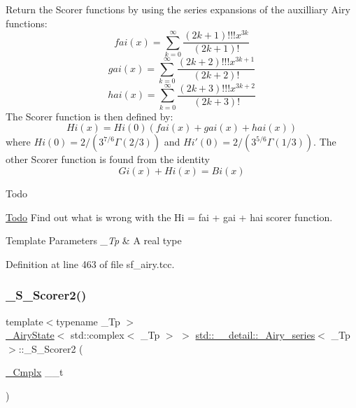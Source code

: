 Return the Scorer functions by using the series expansions of the auxilliary Airy functions\+: \[ fai(x) = \sum_{k=0}^\infty \frac{(2k+1)!!!x^{3k}}{(2k+1)!} \] \[ gai(x) = \sum_{k=0}^\infty \frac{(2k+2)!!!x^{3k+1}}{(2k+2)!} \] \[ hai(x) = \sum_{k=0}^\infty \frac{(2k+3)!!!x^{3k+2}}{(2k+3)!} \] The Scorer function is then defined by\+: \[ Hi(x) = Hi(0)\left(fai(x) + gai(x) + hai(x)\right) \] where $ Hi(0) = 2/(3^{7/6}\Gamma(2/3)) $ and $ Hi'(0) = 2/(3^{5/6}\Gamma(1/3)) $. The other Scorer function is found from the identity \[ Gi(x) + Hi(x) = Bi(x) \]

\begin{DoxyRefDesc}{Todo}
\item[\hyperlink{todo__todo000002}{Todo}]Find out what is wrong with the Hi = fai + gai + hai scorer function.\end{DoxyRefDesc}



\begin{DoxyTemplParams}{Template Parameters}
{\em \+\_\+\+Tp} & A real type \\
\hline
\end{DoxyTemplParams}


Definition at line 463 of file sf\+\_\+airy.\+tcc.

\mbox{\label{classstd_1_1____detail_1_1__Airy__series_a0fb092c153034223a390e259d2f32836}} 
\subsubsection{\texorpdfstring{\+\_\+\+S\+\_\+\+Scorer2()}{\_S\_Scorer2()}}
{\footnotesize\ttfamily template$<$typename \+\_\+\+Tp $>$ \\
\hyperlink{structstd_1_1____detail_1_1__AiryState}{\+\_\+\+Airy\+State}$<$ std\+::complex$<$ \+\_\+\+Tp $>$ $>$ \hyperlink{classstd_1_1____detail_1_1__Airy__series}{std\+::\+\_\+\+\_\+detail\+::\+\_\+\+Airy\+\_\+series}$<$ \+\_\+\+Tp $>$\+::\+\_\+\+S\+\_\+\+Scorer2 (\begin{DoxyParamCaption}\item[{\hyperlink{classstd_1_1____detail_1_1__Airy__series_ab41161caa54609f4735987fbaed41d9d}{\+\_\+\+Cmplx}}]{\+\_\+\+\_\+t }\end{DoxyParamCaption})\hspace{0.3cm}{\ttfamily [static]}}

